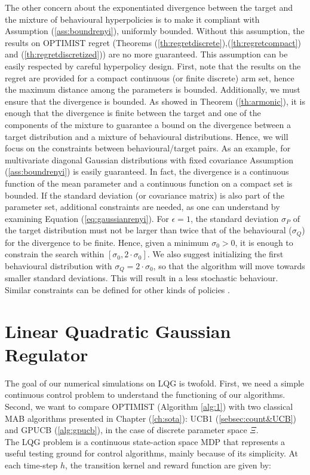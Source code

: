 The other concern about the exponentiated \Renyi divergence between the target and the mixture of behavioural hyperpolicies is to make it compliant with Assumption (\ref{ass:boundrenyi}), \ie uniformly bounded. Without this assumption, the results on \gls{OPTIMIST} regret (Theorems (\ref{th:regretdiscrete}),(\ref{th:regretcompact}) and (\ref{th:regretdiscretized})) are no more guaranteed. This assumption can be easily respected by careful hyperpolicy design. First, note that the results on the regret are provided for a compact continuous (or finite discrete) arm set, hence the maximum distance among the parameters is bounded. Additionally, we must ensure that the \Renyi divergence is bounded. As showed in Theorem (\ref{th:armonic}), it is enough that the divergence is finite between the target and one of the components of the mixture to guarantee a bound on the divergence between a target distribution and a mixture of behavioural distributions. Hence, we will focus on the constraints between behavioural/target pairs. As an example, for multivariate diagonal Gaussian distributions with fixed covariance Assumption (\ref{ass:boundrenyi}) is easily guaranteed. In fact, the \Renyi divergence is a continuous function of the mean parameter \cite{gil2013renyi} and a continuous function on a compact set is bounded. If the standard deviation (or covariance matrix) is also part of the parameter set, additional constraints are needed, as one can understand by examining Equation (\ref{eq:gaussianrenyi}). For $\epsilon=1$, the standard deviation $\sigma_P$ of the target distribution must not be larger than twice that of the behavioural ($\sigma_Q$) for the divergence to be finite. Hence, given a minimum $\sigma_{0} > 0$, it is enough to constrain the search within $[\sigma_0, 2\cdot\sigma_0]$. We also suggest initializing the first behavioural distribution with $\sigma_Q=2\cdot\sigma_0$, so that the algorithm will move towards smaller standard deviations. This will result in a less stochastic behaviour. Similar constraints can be defined for other kinds of policies \cite{gil2013renyi}. 


\section{Linear Quadratic Gaussian Regulator}
The goal of our numerical simulations on \gls{LQG} is twofold. First, we need a simple continuous control problem to understand the functioning of our algorithms. Second, we want to compare \gls{OPTIMIST} (Algorithm \ref{alg:1}) with two classical \gls{MAB} algorithms presented in Chapter (\ref{ch:sota}): \gls{UCB}1 (\ref{sebsec:count&UCB}) and \gls{GPUCB} (\ref{alg:gpucb}), in the case of discrete parameter space $\Xi$.\\
The \gls{LQG} problem \cite{peters2008reinforcement} is a continuous state-action space \gls{MDP} that represents a useful testing ground for control algorithms, mainly because of its simplicity. At each time-step $h$, the transition kernel and reward function are given by:

